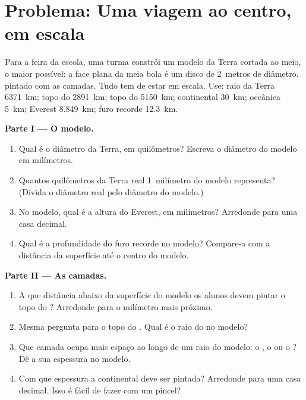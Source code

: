 \section{Problema: Uma viagem ao centro, em escala}

\begin{problem}
\label{pb:g6:inside-the-earth:1}
Para a feira da escola, uma turma constrói um modelo da Terra cortada ao
meio, o maior possível: a face plana da meia bola é um disco de 2~metros
de diâmetro, pintado com as camadas. Tudo tem de estar em escala. Use: raio
da Terra 6371~km; topo do  2891~km; topo do 
5150~km;  continental 30~km;  oceânica 5~km; Everest
8.849~km; furo recorde 12.3~km.

\medskip
\noindent\textbf{Parte I --- O modelo.}
\begin{enumerate}
  \item Qual é o diâmetro da Terra, em quilômetros? Escreva o diâmetro do
        modelo em milímetros.
  \item Quantos quilômetros da Terra real 1~milímetro do modelo representa?
        (Divida o diâmetro real pelo diâmetro do modelo.)
  \item No modelo, qual é a altura do Everest, em milímetros? Arredonde
        para uma casa decimal.
  \item Qual é a profundidade do furo recorde no modelo? Compare-a com a
        distância da superfície até o centro do modelo.
\end{enumerate}

\medskip
\noindent\textbf{Parte II --- As camadas.}
\begin{enumerate}[resume]
  \item A que distância abaixo da superfície do modelo os alunos devem
        pintar o topo do ? Arredonde para o milímetro mais
        próximo.
  \item Mesma pergunta para o topo do . Qual é o raio do
         no modelo?
  \item Que camada ocupa mais espaço ao longo de um raio do modelo: o
        , o  ou o ? Dê a sua espessura no
        modelo.
  \item Com que espessura a  continental deve ser pintada? Arredonde
        para uma casa decimal. Isso é fácil de fazer com um pincel?
\end{enumerate}


\end{problem}
